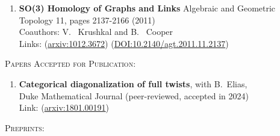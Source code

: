 \documentclass[12pt]{amsart}
\newcommand{\newitem}[1]{\noindent\textsc{#1:}\vskip5pt  }
\begin{document}
\begin{enumerate}
\item {\bf SO(3) Homology of Graphs and Links}
Algebraic and Geometric Topology 11, pages 2137-2166 (2011)\\
Coauthors: V.~ Krushkal and B.~ Cooper\\
Links: (\href{http://arxiv.org/abs/1012.3672}{arxiv:1012.3672}) (\href{https://doi:org/10.2140/agt.2011.11.2137}{DOI:10.2140/agt.2011.11.2137})
\end{enumerate}

\newitem{Papers Accepted for Publication}

\begin{enumerate}
\item{\bf Categorical diagonalization of full twists}, with B.~Elias,\\
Duke Mathematical Journal (peer-reviewed, accepted in 2024)\\
Link: (\href{https://arxiv.org/abs/1801.00191}{arxiv:1801.00191})
\end{enumerate}

\newitem{Preprints}
\end{document}
